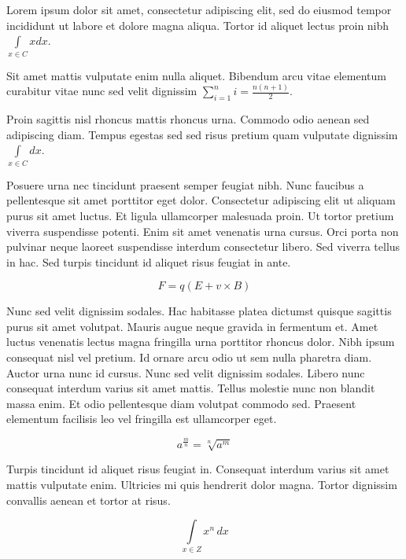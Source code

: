 \documentclass{article}
\begin{document}
	
    Lorem ipsum dolor sit amet, consectetur adipiscing elit, sed do eiusmod tempor incididunt ut labore et dolore magna aliqua. Tortor id aliquet lectus proin nibh 
    \begin{math}
    	\int\limits_{x\in C}xdx
    \end{math}.
    \newline
    
    Sit amet mattis vulputate enim nulla aliquet. Bibendum arcu vitae elementum curabitur vitae nunc sed velit dignissim $ \sum_{i=1}^{n}i=\frac{n(n+1)}{2}  $.
    \newline
    
   Proin sagittis nisl rhoncus mattis rhoncus urna. Commodo odio aenean sed adipiscing diam. Tempus egestas sed sed risus pretium quam vulputate dignissim \( \int\limits_{x\in C}dx \).
   \newline
    
    Posuere urna nec tincidunt praesent semper feugiat nibh. Nunc faucibus a pellentesque sit amet porttitor eget dolor. Consectetur adipiscing elit ut aliquam purus sit amet luctus. Et ligula ullamcorper malesuada proin. Ut tortor pretium viverra suspendisse potenti. Enim sit amet venenatis urna cursus. Orci porta non pulvinar neque laoreet suspendisse interdum consectetur libero. Sed viverra tellus in hac. Sed turpis tincidunt id aliquet risus feugiat in ante.
    
    \[ F=q\left ( E+v \times B \right )  \]
    
    Nunc sed velit dignissim sodales. Hac habitasse platea dictumst quisque sagittis purus sit amet volutpat. Mauris augue neque gravida in fermentum et. Amet luctus venenatis lectus magna fringilla urna porttitor rhoncus dolor. Nibh ipsum consequat nisl vel pretium. Id ornare arcu odio ut sem nulla pharetra diam. Auctor urna nunc id cursus. Nunc sed velit dignissim sodales. Libero nunc consequat interdum varius sit amet mattis. Tellus molestie nunc non blandit massa enim. Et odio pellentesque diam volutpat commodo sed. Praesent elementum facilisis leo vel fringilla est ullamcorper eget.
    
    $$ a^{\frac{m}{n}}=\sqrt[n]{a^{m}} $$
    
    Turpis tincidunt id aliquet risus feugiat in. Consequat interdum varius sit amet mattis vulputate enim. Ultricies mi quis hendrerit dolor magna. Tortor dignissim convallis aenean et tortor at risus. 
    
    \begin{displaymath}
    	\int\limits_{x\in Z}\! x^{n}\, dx
    \end{displaymath}
    
\end{document}
